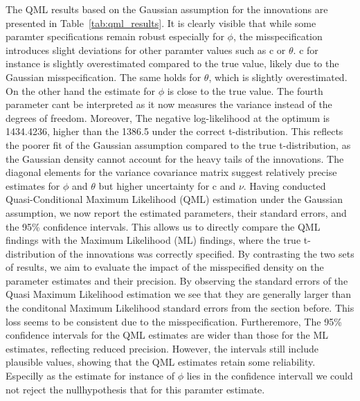 \documentclass[a4paper,12pt]{article}
\begin{document}
The QML results based on the Gaussian assumption for the innovations are presented in Table~\ref{tab:qml_results}. It is clearly visible that while some paramter specifications remain robust especially for $\phi$, the misspecification introduces slight deviations for other paramter values such as c or $\theta$.
c for instance is slightly overestimated compared to the true value, likely due to the Gaussian misspecification. The same holds for $\theta$, which is slightly overestimated. On the other hand the estimate for $\phi$ is close to the true value. The fourth parameter cant be interpreted as it now measures the variance instead of the degrees of freedom.
Moreover, The negative log-likelihood at the optimum is 1434.4236, higher than the 1386.5 under the correct t-distribution.
This reflects the poorer fit of the Gaussian assumption compared to the true t-distribution, as the Gaussian density cannot account for the heavy tails of the innovations. The diagonal elements for the variance covariance matrix suggest relatively precise estimates for $\phi$ and $\theta$ but higher uncertainty for c and $\nu$.
Having conducted Quasi-Conditional Maximum Likelihood (QML) estimation under the Gaussian assumption, we now report the estimated parameters, their standard errors, and the 95\% confidence intervals.  This allows us to directly compare the QML findings with the Maximum Likelihood (ML) findings, where the true t-distribution of the innovations was correctly specified. By contrasting the two sets of results, we aim to evaluate the impact of the misspecified density on the parameter estimates and their precision.
By observing the standard errors of the Quasi Maximum Likelihood estimation we see that they are generally larger than the conditonal Maximum Likelihood standard errors from the section before. This loss seems to be consistent due to the misspecification.
Furtheremore, The 95\% confidence intervals for the QML estimates are wider than those for the ML estimates, reflecting reduced precision. However, the intervals still include plausible values, showing that the QML estimates retain some reliability. Especilly as the estimate for instance of $\phi$ lies in the confidence intervall we could not reject the nullhypothesis that for this paramter estimate.
\end{document}
